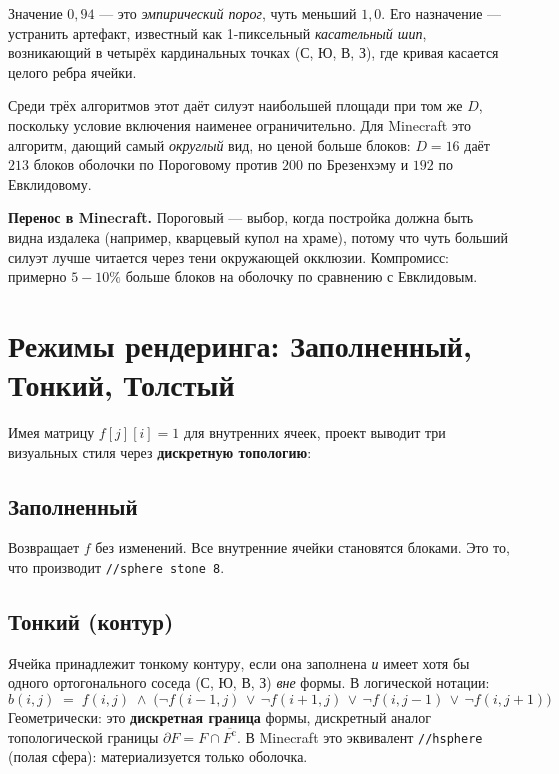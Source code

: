 \documentclass[12pt,a4paper]{scrartcl}
\newcommand{\acc}[1]{\textcolor{accent}{\textbf{#1}}}
\newcommand{\cmd}[1]{\textcolor{earth}{\texttt{\small #1}}}
\begin{document}
Значение \acc{$0{,}94$} — это \emph{эмпирический порог}, чуть меньший $1{,}0$. Его назначение — устранить артефакт, известный как 1-пиксельный \emph{касательный шип}, возникающий в четырёх кардинальных точках (С, Ю, В, З), где кривая касается целого ребра ячейки.

Среди трёх алгоритмов этот даёт силуэт наибольшей площади при том же $D$, поскольку условие включения наименее ограничительно. Для Minecraft это алгоритм, дающий самый \emph{округлый} вид, но ценой больше блоков: $D=16$ даёт $213$ блоков оболочки по Пороговому против $200$ по Брезенхэму и $192$ по Евклидовому.

\begin{minec}
\textbf{Перенос в Minecraft.} Пороговый — выбор, когда постройка должна быть видна издалека (например, кварцевый купол на храме), потому что чуть больший силуэт лучше читается через тени окружающей окклюзии. Компромисс: примерно $5{-}10\%$ больше блоков на оболочку по сравнению с Евклидовым.
\end{minec}

\section{Режимы рендеринга: Заполненный, Тонкий, Толстый}

Имея матрицу $f[j][i] = 1$ для внутренних ячеек, проект выводит три визуальных стиля через \acc{дискретную топологию}:

\subsection{Заполненный}
Возвращает $f$ без изменений. Все внутренние ячейки становятся блоками. Это то, что производит \cmd{//sphere stone 8}.

\subsection{Тонкий (контур)}
Ячейка принадлежит тонкому контуру, если она заполнена \emph{и} имеет хотя бы одного ортогонального соседа (С, Ю, В, З) \emph{вне} формы. В логической нотации:
\[
b(i,j) \;=\; f(i,j) \;\wedge\;
\bigl(\neg f(i{-}1,j)\,\vee\,\neg f(i{+}1,j)\,\vee\,\neg f(i,j{-}1)\,\vee\,\neg f(i,j{+}1)\bigr)
\]
Геометрически: это \acc{дискретная граница} формы, дискретный аналог топологической границы $\partial F = F \cap \overline{F^{\mathrm{c}}}$. В Minecraft это эквивалент \cmd{//hsphere} (полая сфера): материализуется только оболочка.
\end{document}
